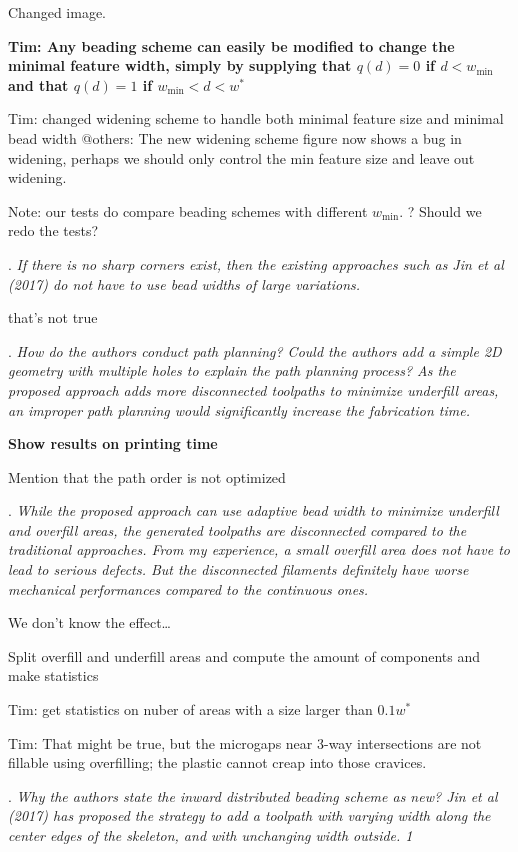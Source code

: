 \documentclass[5p,twocolumn,10pt,times]{elsarticle}
\theoremstyle{definition}
\newcommand{\todo}[1]{{\bf \color{orange}#1}}
\newcommand\Que[1]{%
   \leavevmode\par
   \stepcounter{question}
   \noindent
   \thequestion. {\it#1}\par}
\newcounter{question}
\numberwithin{question}{section}
\newcommand\subQue[1]{%
   \leavevmode\par
   \stepcounter{subquestion}
   \noindent
   \thesubquestion. {\it#1}\par}
\newcounter{subquestion}
\begin{document}
Changed image. 

\todo{
Tim:
Any beading scheme can easily be modified to change the minimal feature width, simply by supplying that $q(d) = 0$ if $d < w_\text{min}$ and that $q(d) = 1$ if $w_\text{min} < d < w^*$

Tim: changed widening scheme to handle both minimal feature size and minimal bead width
@others: The new widening scheme figure now shows a bug in widening, perhaps we should only control the min feature size and leave out widening.

Note: our tests do compare beading schemes with different $w_\text{min}$.
? Should we redo the tests?
}

\subQue{
If there is no sharp corners exist, then the existing approaches such as Jin et al (2017) do not have to use bead widths of large variations. 
}

that’s not true

\Que{
How do the authors conduct path planning? Could the authors add a simple 2D geometry with multiple holes to explain the path planning process? As the proposed approach adds more disconnected toolpaths to minimize underfill areas, an improper path planning would significantly increase the fabrication time. 
}

\todo{
Show results on printing time

Mention that the path order is not optimized
}

\Que{
While the proposed approach can use adaptive bead width to minimize underfill and overfill areas, the generated toolpaths are disconnected compared to the traditional approaches. From my experience, a small overfill area does not have to lead to serious defects. But the disconnected filaments definitely have worse mechanical performances compared to the continuous ones. 
}

We don’t know the effect…

Split overfill and underfill areas and compute the amount of components and make statistics

Tim: get statistics on nuber of areas with a size larger than $0.1 w^*$

Tim: That might be true, but the microgaps near 3-way intersections are not fillable using overfilling; the plastic cannot creap into those cravices.

\Que{
Why the authors state the inward distributed beading scheme as new? Jin et al (2017) has proposed the strategy to add a toolpath with varying width along the center edges of the skeleton, and with unchanging width outside. 1 
}
\end{document}
